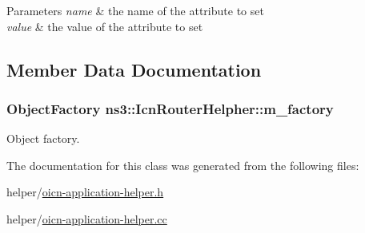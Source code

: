 \begin{DoxyParams}{Parameters}
{\em name} & the name of the attribute to set \\
\hline
{\em value} & the value of the attribute to set \\
\hline
\end{DoxyParams}


\subsection{Member Data Documentation}
\hypertarget{classns3_1_1IcnRouterHelpher_a1a9a541fc339cb6541195330b1c74009}{
\subsubsection[{m\-\_\-factory}]{\setlength{\rightskip}{0pt plus 5cm}Object\-Factory ns3\-::\-Icn\-Router\-Helpher\-::m\-\_\-factory\hspace{0.3cm}{\ttfamily [private]}}}\label{classns3_1_1IcnRouterHelpher_a1a9a541fc339cb6541195330b1c74009}


Object factory. 



The documentation for this class was generated from the following files\-:\begin{DoxyCompactItemize}
\item 
helper/\hyperlink{oicn-application-helper_8h}{oicn-\/application-\/helper.\-h}\item 
helper/\hyperlink{oicn-application-helper_8cc}{oicn-\/application-\/helper.\-cc}\end{DoxyCompactItemize}
